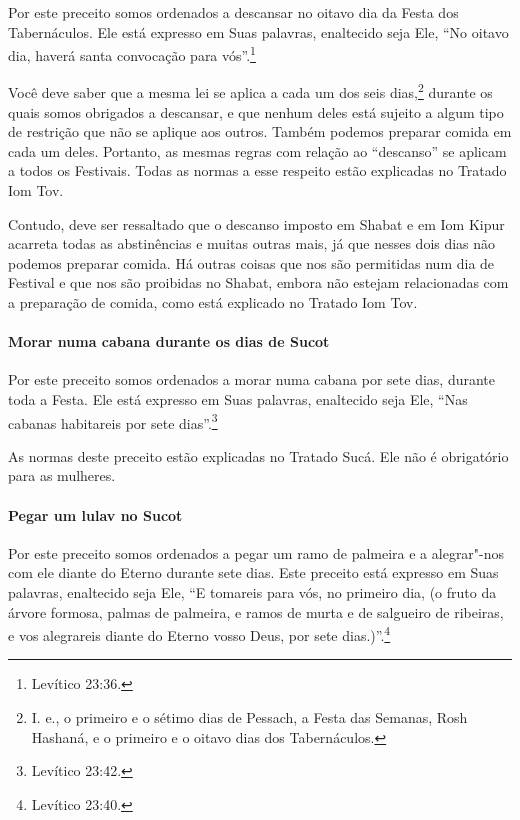 \begin{multicols}{2}
Por este preceito somos ordenados a descansar no oitavo dia da Festa
dos Tabernáculos. Ele está expresso em Suas palavras, enaltecido seja
Ele, ``No oitavo dia, haverá santa convocação para vós''.\footnote{Levítico 23:36.}

Você deve saber que a mesma lei se aplica a cada um dos seis
dias,\footnote{I. e., o primeiro e o sétimo dias de Pessach\starr, a Festa das
Semanas, Rosh Hashaná\starr, e o primeiro e o oitavo dias dos Tabernáculos.} durante os quais somos obrigados a
descansar, e que nenhum deles está sujeito a algum tipo de restrição que não se aplique aos outros. Também podemos preparar comida em cada um deles. Portanto, as mesmas regras com relação ao ``descanso'' se aplicam a todos os Festivais. Todas as normas a esse
respeito estão explicadas no Tratado Iom Tov\starr.

Contudo, deve ser ressaltado que o descanso imposto em Shabat e em Iom
Kipur\starr{} acarreta todas as abstinências e muitas outras mais, já que
nesses dois dias não podemos preparar comida. Há outras coisas que nos
são permitidas num dia de Festival e que nos são proibidas no Shabat,
embora não estejam relacionadas com a preparação de comida, como está
explicado no Tratado Iom Tov\starr.

\paragraph{Morar numa cabana durante os dias de Sucot\starr}

Por este preceito somos ordenados a morar numa cabana por sete dias,
durante toda a Festa. Ele está expresso em Suas palavras, enaltecido
seja Ele, ``Nas cabanas habitareis por sete dias''.\footnote{Levítico 23:42.}

As normas deste preceito estão explicadas no Tratado Sucá\starr. Ele não é
obrigatório para as mulheres.

\paragraph{Pegar um lulav\starr{} no Sucot\starr}

Por este preceito somos ordenados a pegar um ramo de palmeira e a
alegrar"-nos com ele diante do Eterno durante sete dias. Este preceito
está expresso em Suas palavras, enaltecido seja Ele, ``E tomareis para
vós, no primeiro dia, (o fruto da árvore formosa, palmas de palmeira, e
ramos de murta e de salgueiro de ribeiras, e vos alegrareis diante do
Eterno vosso Deus, por sete dias.)''.\footnote{Levítico 23:40.}


\end{multicols}
